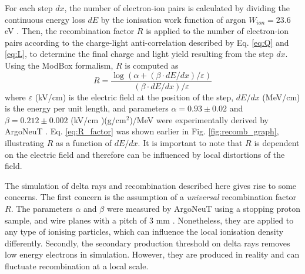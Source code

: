 For each step $dx$, the number of electron-ion pairs is calculated by dividing the continuous energy loss $dE$ by the ionisation work function of argon $W_{ion} = 23.6$ eV \cite{wion_lar}.
Then, the recombination factor $R$ is applied to the number of electron-ion pairs according to the charge-light anti-correlation described by Eq. \ref{eq:Q} and \ref{eq:L}, to determine the final charge and light yield resulting from the step $dx$.                                                                                                                                                      
Using the ModBox formalism, $R$ is computed as \cite{argoneut_recomb}
\begin{equation}
        \label{eq:R_factor}
        R = \frac{\log{ \left( \alpha + \left(\beta \cdot dE/dx\right)/\varepsilon \right)}}{\left(\beta \cdot dE/dx\right)/\varepsilon} 
\end{equation}
where $\varepsilon$ (kV/cm) is the electric field at the position of the step, $dE/dx$ (MeV/cm) is the energy per unit length, and parameters $\alpha = 0.93\pm0.02$ and $\beta = 0.212\pm0.002$ (kV/cm
)(g/cm$^{2}$)/MeV were experimentally derived by ArgoNeuT \cite{argoneut_recomb}.
Eq. \ref{eq:R_factor} was shown earlier in Fig. \ref{fig:recomb_graph}, illustrating $R$ as a function of $dE/dx$.
It is important to note that $R$ is dependent on the electric field and therefore can be influenced by local distortions of the field.

The simulation of delta rays and recombination described here gives rise to some concerns.                                                                                                       
The first concern is the assumption of a \textit{universal} recombination factor $R$.
The parameters $\alpha$ and $\beta$ were measured by ArgoNeuT using a stopping proton sample, and wire planes with a pitch of 3 mm \cite{argoneut_recomb}.
Nonetheless, they are applied to any type of ionising particles, which can influence the local ionisation density differently. 
Secondly, the secondary production threshold on delta rays removes low energy electrons in simulation.
However, they are produced in reality and can fluctuate recombination at a local scale. 

